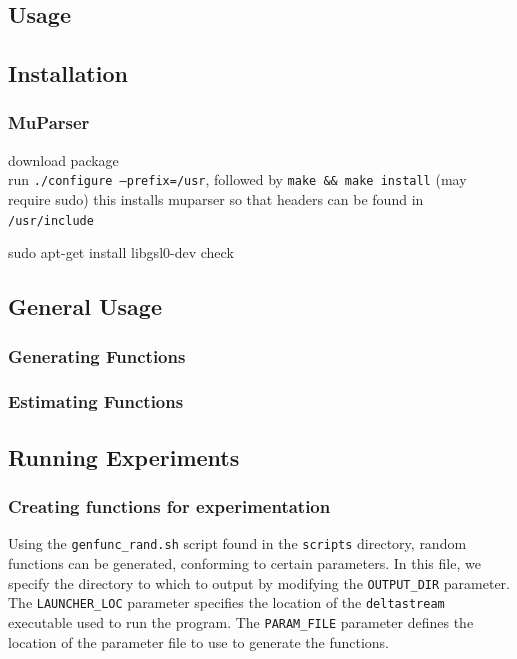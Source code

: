 \documentclass[a4paper,11pt]{article}
\begin{document}
\begin{appendices}
\section{Usage}
\label{sec-10}
\subsection{Installation}
\label{sec-10-1}
\subsubsection{MuParser}
\label{sec-10-1-1}

 download package\\
 run \texttt{./configure --prefix=/usr}, followed by \texttt{make \&\& make install} (may require sudo)
 this installs muparser so that headers can be found in \texttt{/usr/include}
 \begin{verbatimtab}   
 sudo apt-get install libgsl0-dev check 
 \end{verbatimtab}
\subsection{General Usage}
\label{sec-10-2}
\subsubsection{Generating Functions}
\label{sec-10-2-1}
\subsubsection{Estimating Functions}
\label{sec-10-2-2}
\subsection{Running Experiments}
\label{sec-10-3}
\subsubsection{Creating functions for experimentation}
\label{sec-10-3-1}

Using the \texttt{genfunc\_rand.sh} script found in the \texttt{scripts} directory, random
functions can be generated, conforming to certain parameters. In this file,
we specify the directory to which to output by modifying the
\texttt{OUTPUT\_DIR} parameter. The \texttt{LAUNCHER\_LOC} parameter specifies the
location of the \texttt{deltastream} executable used to run the program. The
\texttt{PARAM\_FILE} parameter defines the location of the parameter file to use
to generate the functions.


\end{appendices}
\end{document}
